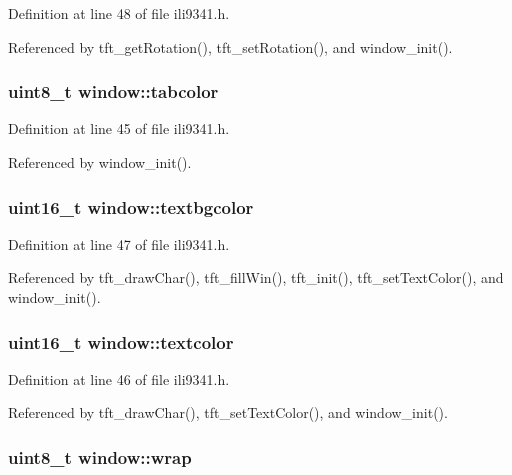 Definition at line 48 of file ili9341.\-h.



Referenced by tft\-\_\-get\-Rotation(), tft\-\_\-set\-Rotation(), and window\-\_\-init().

\hypertarget{structwindow_a8cf49b061febfaaaf9a52793e80d4796}{
\subsubsection[{tabcolor}]{\setlength{\rightskip}{0pt plus 5cm}uint8\-\_\-t window\-::tabcolor}}\label{structwindow_a8cf49b061febfaaaf9a52793e80d4796}


Definition at line 45 of file ili9341.\-h.



Referenced by window\-\_\-init().

\hypertarget{structwindow_ae49a3c2629ffa093e60edc3f9e9e0917}{
\subsubsection[{textbgcolor}]{\setlength{\rightskip}{0pt plus 5cm}uint16\-\_\-t window\-::textbgcolor}}\label{structwindow_ae49a3c2629ffa093e60edc3f9e9e0917}


Definition at line 47 of file ili9341.\-h.



Referenced by tft\-\_\-draw\-Char(), tft\-\_\-fill\-Win(), tft\-\_\-init(), tft\-\_\-set\-Text\-Color(), and window\-\_\-init().

\hypertarget{structwindow_aca878bb381210ef2ef8d764d08b126ae}{
\subsubsection[{textcolor}]{\setlength{\rightskip}{0pt plus 5cm}uint16\-\_\-t window\-::textcolor}}\label{structwindow_aca878bb381210ef2ef8d764d08b126ae}


Definition at line 46 of file ili9341.\-h.



Referenced by tft\-\_\-draw\-Char(), tft\-\_\-set\-Text\-Color(), and window\-\_\-init().

\hypertarget{structwindow_aee853dc29d3cf708890faff063ce9afb}{
\subsubsection[{wrap}]{\setlength{\rightskip}{0pt plus 5cm}uint8\-\_\-t window\-::wrap}}\label{structwindow_aee853dc29d3cf708890faff063ce9afb}


